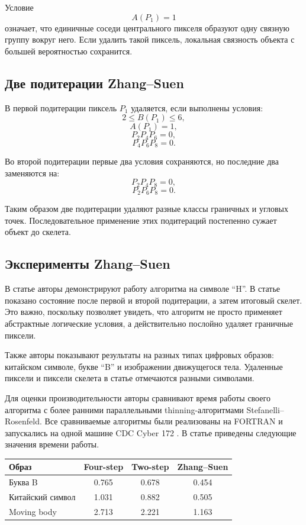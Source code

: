 \documentclass[12pt,a4paper]{article}
\begin{document}
Условие
\[
    A(P_1)=1
\]
означает, что единичные соседи центрального пикселя образуют одну связную группу вокруг него. Если удалить такой пиксель, локальная связность объекта с большей вероятностью сохранится.

\subsection{Две подитерации Zhang--Suen}

В первой подитерации пиксель $P_1$ удаляется, если выполнены условия:
\[
    2 \le B(P_1) \le 6,
\]
\[
    A(P_1)=1,
\]
\[
    P_2P_4P_6=0,
\]
\[
    P_4P_6P_8=0.
\]

Во второй подитерации первые два условия сохраняются, но последние два заменяются на:
\[
    P_2P_4P_8=0,
\]
\[
    P_2P_6P_8=0.
\]

Таким образом две подитерации удаляют разные классы граничных и угловых точек. Последовательное применение этих подитераций постепенно сужает объект до скелета.

\subsection{Эксперименты Zhang--Suen}

В статье \cite{zhang1984} авторы демонстрируют работу алгоритма на символе ``H''. В статье показано состояние после первой и второй подитерации, а затем итоговый скелет. Это важно, поскольку позволяет увидеть, что алгоритм не просто применяет абстрактные логические условия, а действительно послойно удаляет граничные пиксели.

Также авторы показывают результаты на разных типах цифровых образов: китайском символе, букве ``B'' и изображении движущегося тела. Удаленные пиксели и пиксели скелета в статье отмечаются разными символами.

Для оценки производительности авторы сравнивают время работы своего алгоритма с более ранними параллельными thinning-алгоритмами Stefanelli--Rosenfeld. Все сравниваемые алгоритмы были реализованы на FORTRAN и запускались на одной машине CDC Cyber 172 \cite{zhang1984}. В статье приведены следующие значения времени работы.

\begin{center}
\begin{tabular}{lccc}
\toprule
Образ & Four-step & Two-step & Zhang--Suen \\
\midrule
Буква B & 0.765 & 0.678 & 0.454 \\
Китайский символ & 1.031 & 0.882 & 0.505 \\
Moving body & 2.713 & 2.221 & 1.163 \\
\bottomrule
\end{tabular}
\end{center}
\end{document}
